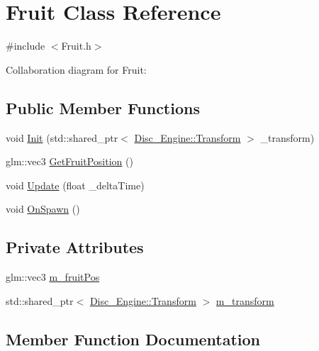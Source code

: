 \hypertarget{class_fruit}{}\section{Fruit Class Reference}
\label{class_fruit}


{\ttfamily \#include $<$Fruit.\+h$>$}



Collaboration diagram for Fruit\+:
\subsection*{Public Member Functions}
\begin{DoxyCompactItemize}
\item 
void \mbox{\hyperlink{class_fruit_ac07906720903451d43546138819d2ea0}{Init}} (std\+::shared\+\_\+ptr$<$ \mbox{\hyperlink{class_disc___engine_1_1_transform}{Disc\+\_\+\+Engine\+::\+Transform}} $>$ \+\_\+transform)
\item 
glm\+::vec3 \mbox{\hyperlink{class_fruit_aedda7d90a8fba9a2f67efb8dc8cb2f37}{Get\+Fruit\+Position}} ()
\item 
void \mbox{\hyperlink{class_fruit_afde7b65e056caaa0fba2645d7574f724}{Update}} (float \+\_\+delta\+Time)
\item 
void \mbox{\hyperlink{class_fruit_a3783bb826140cce1ae00178c6b306b10}{On\+Spawn}} ()
\end{DoxyCompactItemize}
\subsection*{Private Attributes}
\begin{DoxyCompactItemize}
\item 
glm\+::vec3 \mbox{\hyperlink{class_fruit_a0b8f4070211f8ed33779d22d9b3a0cb0}{m\+\_\+fruit\+Pos}}
\item 
std\+::shared\+\_\+ptr$<$ \mbox{\hyperlink{class_disc___engine_1_1_transform}{Disc\+\_\+\+Engine\+::\+Transform}} $>$ \mbox{\hyperlink{class_fruit_af8de25a7f3f1bd9aa41ad648af892f27}{m\+\_\+transform}}
\end{DoxyCompactItemize}


\subsection{Member Function Documentation}
\mbox{\label{class_fruit_aedda7d90a8fba9a2f67efb8dc8cb2f37}} 
